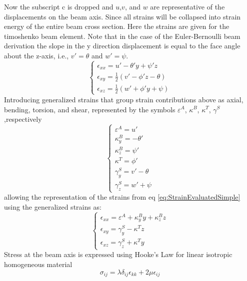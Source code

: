 Now the subscript c is dropped and $ u $,$ v $, and $ w $ are representative of the displacements on the beam axis. Since all strains will be collapsed into strain energy of the entire beam cross section. Here the strains are given for the timoshenko beam element. Note that in the case of the Euler-Bernoulli beam derivation the slope in the y direction displacement is equal to the face angle about the z-axis, i.e., $v'=\theta$ and $w'=\psi$.
\begin{equation}\label{eq:StrainEvaluatedSimple}
\left\{\begin{array}{l}
\epsilon_{xx}=u'-\theta'y+\psi'z\\
\epsilon_{xy}=\frac{1}{2}(v'-\phi'z-\theta)\\
\epsilon_{xz}=\frac{1}{2}(w'+\phi'y+\psi)
\end{array}\right.
\end{equation}
Introducing generalized strains that group strain contributions above as axial, bending, torsion, and shear, represented by the symbols $ \varepsilon^A $, $ \kappa^{B} $, $ \kappa^T $, $ \gamma^S $,respectively
\begin{equation}\label{eq:GeneralizedStrains}
\left\{\begin{array}{l}
\varepsilon^A=u'\\
\kappa^{B}_{y}=-\theta'\\
\kappa^{B}_{z}=\psi'\\
\kappa^T=\phi'\\
\gamma^{S}_{y}=v'-\theta\\
\gamma^{S}_{z}=w'+\psi\end{array}\right.
\end{equation}
allowing the representation of the strains from eq \ref{eq:StrainEvaluatedSimple} using the generalized strains as:
\begin{equation}\label{eq:StrainEvaluatedSimpleGeneralized}
\left\{\begin{array}{l}
\epsilon_{xx}=\varepsilon^A+\kappa^B_yy+\kappa^B_zz\\
\epsilon_{xy}=\gamma^S_y-\kappa^Tz\\
\epsilon_{xz}=\gamma^S_z+\kappa^Ty
\end{array}\right.
\end{equation}
Stress at the beam axis is expressed using Hooke's Law for linear isotropic homogeneous material
\begin{equation}\label{LinearElasticStressStrainRelationship}
\sigma_{ij}=\lambda\delta_{ij}\epsilon_{kk}+2\mu\epsilon_{ij}
\end{equation}
